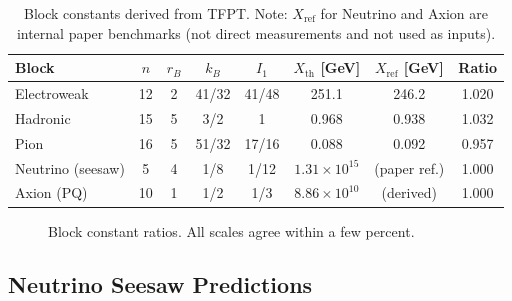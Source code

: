 \begin{table}[H]
\centering
\begin{tabular}{@{}lccccccc@{}}
\toprule
\textbf{Block} & $n$ & $r_B$ & $k_B$ & $I_1$ & $X_{\text{th}}$ [GeV] & 
    $X_{\text{ref}}$ [GeV] & \textbf{Ratio}\\
\midrule
Electroweak & 12 & 2 & 41/32 & 41/48 & 251.1 & 246.2 & 1.020\\
Hadronic & 15 & 5 & 3/2 & 1 & 0.968 & 0.938 & 1.032\\
Pion & 16 & 5 & 51/32 & 17/16 & 0.088 & 0.092 & 0.957\\
Neutrino (seesaw) & 5 & 4 & 1/8 & 1/12 & $1.31\times10^{15}$ & (paper ref.) & 1.000\\
Axion (PQ) & 10 & 1 & 1/2 & 1/3 & $8.86\times10^{10}$ & (derived) & 1.000\\
\bottomrule
\end{tabular}
\caption{Block constants derived from TFPT. Note: $X_{\text{ref}}$ for Neutrino 
and Axion are internal paper benchmarks (not direct measurements and not used as inputs).}
\label{tab:blocks}
\end{table}

\begin{figure}[H]
\centering
{}
\caption{Block constant ratios. All scales agree within a few percent.}
\label{fig:blocks}
\end{figure}

\subsection{Neutrino Seesaw Predictions}


